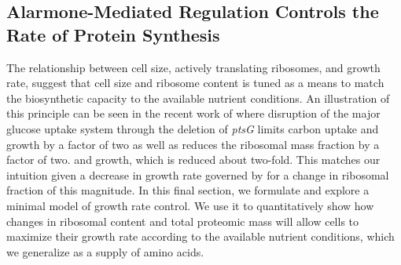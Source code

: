



\subsection{Alarmone-Mediated Regulation Controls the Rate of Protein Synthesis}
The relationship between cell size, actively translating ribosomes, and
growth rate, suggest that cell size and ribosome content is tuned as a means
to match the biosynthetic capacity to the available nutrient conditions. An
illustration of this principle can be seen in the recent work of
\cite{dai2016} where disruption of the major glucose uptake system through
the deletion of \textit{ptsG} limits carbon uptake and growth by a factor of
two as well as reduces the ribosomal mass fraction by a factor of two. and
growth, which is reduced about two-fold. This matches our intuition given a
decrease in growth rate governed by  for a
change in ribosomal fraction of this magnitude. In this final section, we
formulate and explore a minimal model of growth rate control. We use it to
quantitatively show how changes in ribosomal content and total proteomic mass
will allow cells to maximize their growth rate according to the available
nutrient conditions, which we generalize as a supply of amino acids.

